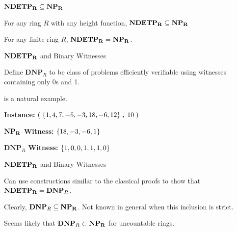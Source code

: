 \documentclass[c]{beamer}
\begin{document}
\begin{frame}{$\mathbf{NDETP_R} \subseteq \mathbf{NP_R}$}
  
  \begin{theorem}
    For any ring $R$ with any height function, $\mathbf{NDETP_R} \subseteq \mathbf{NP_R}$
  \end{theorem}
  
  \pause
  \vspace{\baselineskip}

  \begin{theorem}
    For any finite ring $R$, $\mathbf{NDETP_R} = \mathbf{NP_R}$.
  \end{theorem}
  
\end{frame}

\begin{frame}{$\mathbf{NDETP_R}$ and Binary Witnesses}

  Define $\mathbf{DNP}_R$ to be class of problems efficiently
  verifiable using witnesses containing only 0s and 1.\pause

  \vspace{\baselineskip}

  \subsum{} is a natural example.\pause
  
  \vspace{\baselineskip}

  \textbf{Instance:} $(\;\{1,4,7,-5,-3,18,-6,12\}\;, \;10\;)$

  \textbf{$\mathbf{NP_R}$ Witness:}  $\{18, -3, -6, 1\}$
  
  \textbf{$\mathbf{DNP}_R$ Witness:}  $\{1,0,0,1,1,1,0\}$
\end{frame}

\begin{frame}{$\mathbf{NDETP_R}$ and Binary Witnesses}

  Can use constructions similar to the classical proofs to show that
  $\mathbf{NDETP_R} = \mathbf{DNP}_R$.\pause

  \vspace{\baselineskip}

  Clearly, $\mathbf{DNP}_R \subseteq \mathbf{NP_R}$.  Not known in general when
  this inclusion is strict.\pause

  \vspace{\baselineskip}

  Seems likely that $\mathbf{DNP}_R \subset \mathbf{NP_R}$ for uncountable
  rings.
  
\end{frame}
\end{document}
